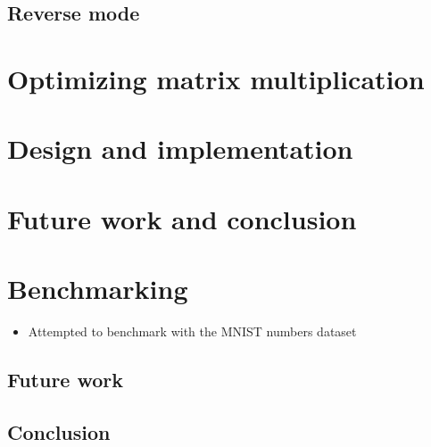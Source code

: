 \documentclass{beamer}
\begin{document}
\subsection{Reverse mode}

\section{Optimizing matrix multiplication}

\section{Design and implementation}

\section{Future work and conclusion}

\section{Benchmarking}

\begin{frame}
    \begin{itemize}
        \item Attempted to benchmark with the MNIST numbers dataset
    \end{itemize}
\end{frame}

\subsection{Future work}

\subsection{Conclusion}
\end{document}
